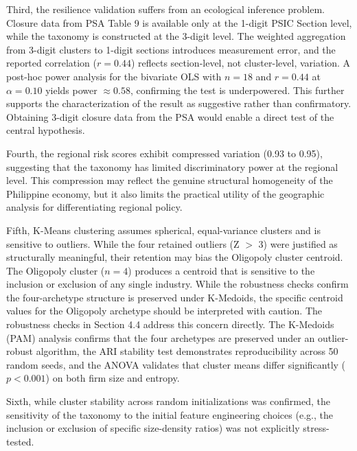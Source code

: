 \documentclass[acmtog, nonacm]{acmart}
\begin{document}
Third, the resilience validation suffers from an ecological inference problem. Closure data from PSA Table 9 is available only at the 1-digit PSIC Section level, while the taxonomy is constructed at the 3-digit level. The weighted aggregation from 3-digit clusters to 1-digit sections introduces measurement error, and the reported correlation ($r = 0.44$) reflects section-level, not cluster-level, variation. A post-hoc power analysis for the bivariate OLS with $n = 18$ and $r = 0.44$ at $\alpha = 0.10$ yields power $\approx 0.58$, confirming the test is underpowered. This further supports the characterization of the result as suggestive rather than confirmatory. Obtaining 3-digit closure data from the PSA would enable a direct test of the central hypothesis.

Fourth, the regional risk scores exhibit compressed variation (0.93 to 0.95), suggesting that the taxonomy has limited discriminatory power at the regional level. This compression may reflect the genuine structural homogeneity of the Philippine economy, but it also limits the practical utility of the geographic analysis for differentiating regional policy.

Fifth, K-Means clustering assumes spherical, equal-variance clusters and is sensitive to outliers. While the four retained outliers (Z $>$ 3) were justified as structurally meaningful, their retention may bias the Oligopoly cluster centroid. The Oligopoly cluster ($n = 4$) produces a centroid that is sensitive to the inclusion or exclusion of any single industry. While the robustness checks confirm the four-archetype structure is preserved under K-Medoids, the specific centroid values for the Oligopoly archetype should be interpreted with caution. The robustness checks in Section 4.4 address this concern directly. The K-Medoids (PAM) analysis confirms that the four archetypes are preserved under an outlier-robust algorithm, the ARI stability test demonstrates reproducibility across 50 random seeds, and the ANOVA validates that cluster means differ significantly ($p < 0.001$) on both firm size and entropy.

Sixth, while cluster stability across random initializations was confirmed, the sensitivity of the taxonomy to the initial feature engineering choices (e.g., the inclusion or exclusion of specific size-density ratios) was not explicitly stress-tested.
\end{document}
